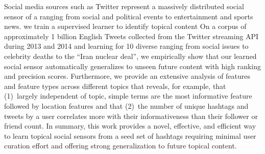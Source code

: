 
Social media sources such as Twitter represent a massively distributed
social sensor of a  ranging from social and
political events to entertainment and sports news.  
 we
train a supervised learner to identify topical content 
On a corpus of approximately 1 billion English Tweets
collected from the Twitter
streaming API during 2013 and 2014 and learning for 10 diverse 
ranging from social issues to celebrity deaths to the ``Iran nuclear
deal'', we empirically show that our learned social sensor
automatically generalizes to unseen future content 
with high ranking and precision scores.  Furthermore, 
we provide an extensive analysis of features and feature types across
different topics that reveals, for example, that (1)~largely
independent of topic, simple terms are the most informative feature
followed by location features and that (2)~the number of unique
hashtags and tweets by a user correlates more with their
informativeness than their follower or friend count.  In summary, this
work provides a novel, effective, and efficient way to learn topical
social sensors from a seed set of hashtags requiring minimal user
curation effort and offering strong generalization to future topical content.


